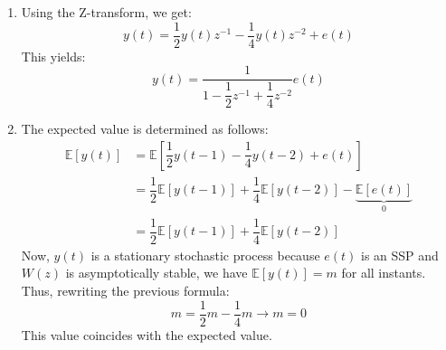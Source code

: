 \begin{enumerate}
    \item Using the Z-transform, we get:
        \[y(t)=\dfrac{1}{2}y(t)z^{-1}-\dfrac{1}{4}y(t)z^{-2}+e(t)\]
        This yields:
        \[y(t)=\dfrac{1}{1-\dfrac{1}{2}z^{-1}+\dfrac{1}{4}z^{-2}}e(t)\]
    \item The expected value is determined as follows:
        \begin{align*}
            \mathbb{E}\left[y(t)\right]     &= \mathbb{E}\left[\dfrac{1}{2}y(t-1)-\dfrac{1}{4}y(t-2)+e(t)\right] \\
                                            &= \dfrac{1}{2}\mathbb{E}\left[y(t-1)\right] +\dfrac{1}{4}\mathbb{E}\left[y(t-2)\right]-\underbrace{\mathbb{E}\left[e(t)\right]}_0 \\
                                            &= \dfrac{1}{2}\mathbb{E}\left[y(t-1)\right] +\dfrac{1}{4}\mathbb{E}\left[y(t-2)\right]
        \end{align*}
        Now, $y(t)$ is a stationary stochastic process because $e(t)$ is an SSP and $W(z)$ is asymptotically stable, we have $\mathbb{E}\left[y(t)\right]=m$ for all instants. 
        Thus, rewriting the previous formula:
        \[m=\dfrac{1}{2}m - \dfrac{1}{4}m\rightarrow m=0\]
        This value coincides with the expected value.


\end{enumerate}
